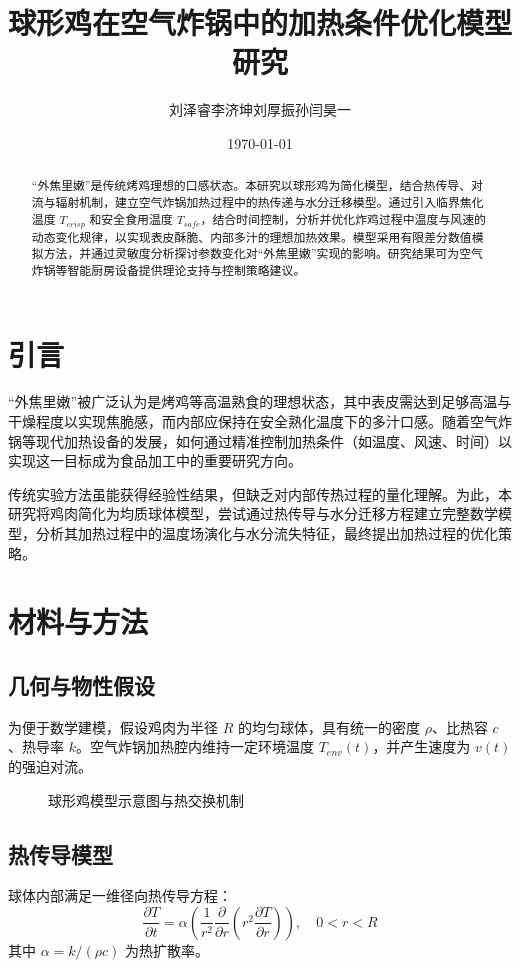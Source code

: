 \documentclass[12pt]{article}
\title{球形鸡在空气炸锅中的加热条件优化模型研究}
\author{刘泽睿\quad 李济坤\quad 刘厚振\quad 孙闫昊一}
\date{\today}
\begin{document}
\maketitle

\begin{abstract}
“外焦里嫩”是传统烤鸡理想的口感状态。本研究以球形鸡为简化模型，结合热传导、对流与辐射机制，建立空气炸锅加热过程中的热传递与水分迁移模型。通过引入临界焦化温度 $T_{crisp}$ 和安全食用温度 $T_{safe}$，结合时间控制，分析并优化炸鸡过程中温度与风速的动态变化规律，以实现表皮酥脆、内部多汁的理想加热效果。模型采用有限差分数值模拟方法，并通过灵敏度分析探讨参数变化对“外焦里嫩”实现的影响。研究结果可为空气炸锅等智能厨房设备提供理论支持与控制策略建议。
\end{abstract}

\section{引言}
“外焦里嫩”被广泛认为是烤鸡等高温熟食的理想状态，其中表皮需达到足够高温与干燥程度以实现焦脆感，而内部应保持在安全熟化温度下的多汁口感。随着空气炸锅等现代加热设备的发展，如何通过精准控制加热条件（如温度、风速、时间）以实现这一目标成为食品加工中的重要研究方向。

传统实验方法虽能获得经验性结果，但缺乏对内部传热过程的量化理解。为此，本研究将鸡肉简化为均质球体模型，尝试通过热传导与水分迁移方程建立完整数学模型，分析其加热过程中的温度场演化与水分流失特征，最终提出加热过程的优化策略\cite{Incropera,Moisture,Quality}。

\section{材料与方法}

\subsection{几何与物性假设}
为便于数学建模，假设鸡肉为半径 $R$ 的均匀球体，具有统一的密度 $\rho$、比热容 $c$、热导率 $k$。空气炸锅加热腔内维持一定环境温度 $T_{env}(t)$，并产生速度为 $v(t)$ 的强迫对流。

\begin{figure}[htbp]
\centering
\caption{球形鸡模型示意图与热交换机制}
\label{fig:model}
\end{figure}

\subsection{热传导模型}
球体内部满足一维径向热传导方程：
\begin{equation}
\frac{\partial T}{\partial t} = \alpha \left( \frac{1}{r^2} \frac{\partial}{\partial r}\left(r^2 \frac{\partial T}{\partial r} \right) \right), \quad 0 < r < R
\end{equation}
其中 $\alpha = k/(\rho c)$ 为热扩散率。
\end{document}
